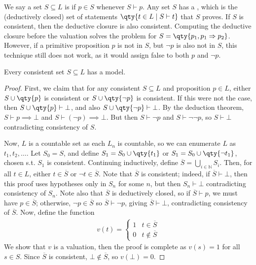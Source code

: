 We say a set $S \subseteq L$ is  if $p \in S$ whenever $S \vdash p$.
Any set $S$ has a , which is the (deductively closed) set of statements $\qty{t \in L \mid S \vdash t}$ that $S$ proves.
If $S$ is consistent, then the deductive closure is also consistent.
Computing the deductive closure before the valuation solves the problem for $S = \qty{p_1, p_1 \implies p_2}$.
However, if a primitive proposition $p$ is not in $S$, but $\neg p$ is also not in $S$, this technique still does not work, as it would assign false to both $p$ and $\neg p$.
\begin{theorem}
    Every consistent set $S \subseteq L$ has a model.
\end{theorem}
\begin{proof}
    First, we claim that for any consistent $S \subseteq L$ and proposition $p \in L$, either $S \cup \qty{p}$ is consistent or $S \cup \qty{\neg p}$ is consistent.
    If this were not the case, then $S \cup \qty{p} \vdash \bot$, and also $S \cup \qty{\neg p} \vdash \bot$.
    By the deduction theorem, $S \vdash p \implies \bot$ and $S \vdash (\neg p) \implies \bot$.
    But then $S \vdash \neg p$ and $S \vdash \neg\neg p$, so $S \vdash \bot$ contradicting consistency of $S$.

    Now, $L$ is a countable set as each $L_n$ is countable, so we can enumerate $L$ as $t_1, t_2, \dots$.
    Let $S_0 = S$, and define $S_1 = S_0 \cup \qty{t_1}$ or $S_1 = S_0 \cup \qty{\neg t_1}$, chosen s.t. $S_1$ is consistent.
    Continuing inductively, define $\overline S = \bigcup_{i \in \mathbb N} S_i$.
    Then, for all $t \in L$, either $t \in \overline S$ or $\neg t \in \overline S$.
    Note that $\overline S$ is consistent; indeed, if $\overline S \vdash \bot$, then this proof uses hypotheses only in $S_n$ for some $n$, but then $S_n \vdash \bot$ contradicting consistency of $S_n$.
    Note also that $\overline S$ is deductively closed, so if $\overline S \vdash p$, we must have $p \in \overline S$; otherwise, $\neg p \in \overline S$ so $\overline S \vdash \neg p$, giving $\overline S \vdash \bot$, contradicting consistency of $\overline S$.
    Now, define the function
    \begin{align*}
v(t) = \begin{cases}
        1 & t \in \overline S \\
        0 & t \not\in \overline S
    \end{cases}
\end{align*}
    We show that $v$ is a valuation, then the proof is complete as $v(s) = 1$ for all $s \in S$.
    Since $\overline S$ is consistent, $\bot \not\in \overline S$, so $v(\bot) = 0$.


\end{proof}
